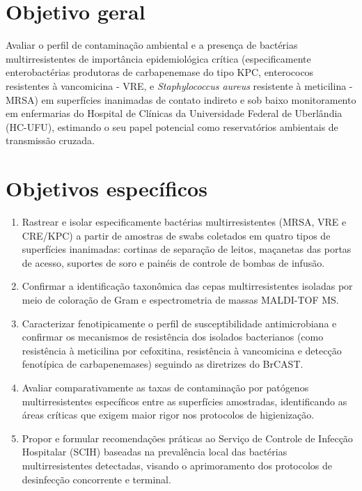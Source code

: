 \documentclass[12pt,a4paper]{article}
\begin{document}
\section{Objetivo geral}
Avaliar o perfil de contaminação ambiental e a presença de bactérias multirresistentes de importância epidemiológica crítica (especificamente enterobactérias produtoras de carbapenemase do tipo KPC, enterococos resistentes à vancomicina - VRE, e \textit{Staphylococcus aureus} resistente à meticilina - MRSA) em superfícies inanimadas de contato indireto e sob baixo monitoramento em enfermarias do Hospital de Clínicas da Universidade Federal de Uberlândia (HC-UFU), estimando o seu papel potencial como reservatórios ambientais de transmissão cruzada.

\section{Objetivos específicos}
\begin{enumerate}
    \item Rastrear e isolar especificamente bactérias multirresistentes (MRSA, VRE e CRE/KPC) a partir de amostras de swabs coletados em quatro tipos de superfícies inanimadas: cortinas de separação de leitos, maçanetas das portas de acesso, suportes de soro e painéis de controle de bombas de infusão.
    \item Confirmar a identificação taxonômica das cepas multirresistentes isoladas por meio de coloração de Gram e espectrometria de massas MALDI-TOF MS.
    \item Caracterizar fenotipicamente o perfil de susceptibilidade antimicrobiana e confirmar os mecanismos de resistência dos isolados bacterianos (como resistência à meticilina por cefoxitina, resistência à vancomicina e detecção fenotípica de carbapenemases) seguindo as diretrizes do BrCAST.
    \item Avaliar comparativamente as taxas de contaminação por patógenos multirresistentes específicos entre as superfícies amostradas, identificando as áreas críticas que exigem maior rigor nos protocolos de higienização.
    \item Propor e formular recomendações práticas ao Serviço de Controle de Infecção Hospitalar (SCIH) baseadas na prevalência local das bactérias multirresistentes detectadas, visando o aprimoramento dos protocolos de desinfecção concorrente e terminal.
\end{enumerate}
\newpage

\end{document}
